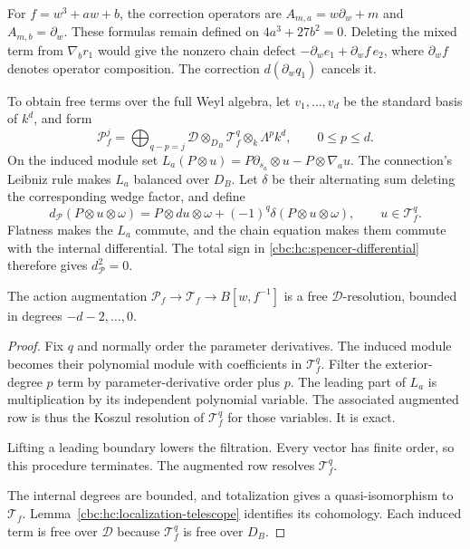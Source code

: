 For $f=w^3+aw+b$, the correction operators are
$A_{m,a}=w\partial_w+m$ and $A_{m,b}=\partial_w$.
These formulas remain defined on $4a^3+27b^2=0$.
Deleting the mixed term from $\nabla_br_1$ would give
the nonzero chain defect
$-\partial_we_1+\partial_wf\,e_2$, where $\partial_wf$
denotes operator composition. The correction
$d(\partial_wq_1)$ cancels it.

To obtain free terms over the full Weyl algebra, let
$v_1,\ldots,v_d$ be the standard basis of $k^d$, and form
\[
 \mathcal P_f^j
 =\bigoplus_{q-p=j}
   \mathscr D\otimes_{D_B}\mathcal T_f^q\otimes_k\Lambda^pk^d,
 \qquad 0\leq p\leq d.
\]
On the induced module set
$L_a(P\otimes u)=P\partial_{s_a}\otimes u-P\otimes\nabla_au$.
The connection's Leibniz rule makes $L_a$ balanced over
$D_B$. Let $\delta$ be their alternating sum deleting the
corresponding wedge factor, and define
\begin{equation}\label{cbc:hc:spencer-differential}
 d_{\mathcal P}(P\otimes u\otimes\omega)
 =P\otimes du\otimes\omega
   +(-1)^q\delta(P\otimes u\otimes\omega),
 \qquad u\in\mathcal T_f^q.
\end{equation}
Flatness makes the $L_a$ commute, and the chain equation
makes them commute with the internal differential.
The total sign in \eqref{cbc:hc:spencer-differential}
therefore gives $d_{\mathcal P}^2=0$.

\begin{proposition}\label{cbc:hc:spencer-resolution}
The action augmentation
$\mathcal P_f\to\mathcal T_f\to B[w,f^{-1}]$ is a free
$\mathscr D$-resolution, bounded in degrees $-d-2,\ldots,0$.
\end{proposition}

\begin{proof}
Fix $q$ and normally order the parameter derivatives.
The induced module becomes their polynomial module with
coefficients in $\mathcal T_f^q$. Filter the exterior-degree
$p$ term by parameter-derivative order plus $p$.
The leading part of $L_a$ is multiplication by its independent
polynomial variable. The associated augmented row is thus
the Koszul resolution of $\mathcal T_f^q$ for those variables.
It is exact.

Lifting a leading boundary lowers the filtration.
Every vector has finite order, so this procedure terminates.
The augmented row resolves $\mathcal T_f^q$.

The internal degrees are bounded, and totalization gives
a quasi-isomorphism to $\mathcal T_f$.
Lemma~\ref{cbc:hc:localization-telescope} identifies its
cohomology. Each induced term is free over $\mathscr D$
because $\mathcal T_f^q$ is free over $D_B$.
\end{proof}

